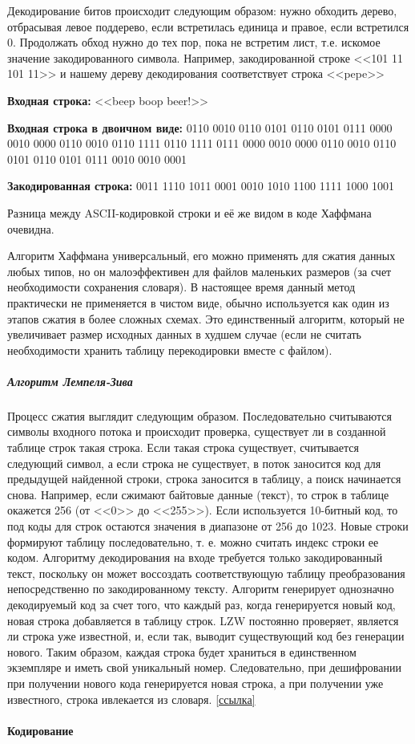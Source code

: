 Декодирование битов происходит следующим образом: нужно обходить дерево,
отбрасывая левое поддерево, если встретилась единица и правое, если
встретился 0. Продолжать обход нужно до тех пор, пока не встретим лист, т.е.
искомое значение закодированного символа. Например, закодированной строке
<<101 11 101 11>> и нашему дереву декодирования соответствует строка <<pepe>>

\noindent \textbf{Входная строка: }<<beep boop beer!>>

\noindent \textbf{Входная строка в двоичном виде:} 0110 0010 0110 0101 0110
0101 0111 0000 0010 0000 0110 0010 0110 1111 0110 1111 0111 0000 0010 0000
0110 0010 0110 0101 0110 0101 0111 0010 0010 0001

\noindent \textbf{Закодированная строка:} 0011 1110 1011 0001 0010 1010 1100
1111 1000 1001

Разница между ASCII-кодировкой строки и её же видом в коде Хаффмана очевидна.

Алгоритм Хаффмана универсальный, его можно применять для сжатия данных любых
типов, но он малоэффективен для файлов маленьких размеров (за счет
необходимости сохранения словаря). В настоящее время данный метод практически
не применяется в чистом виде, обычно используется как один из этапов сжатия в
более сложных схемах. Это единственный алгоритм, который не увеличивает
размер исходных данных в худшем случае (если не считать необходимости хранить
таблицу перекодировки вместе с файлом).

\subparagraph{Алгоритм Лемпеля-Зива}

Процесс сжатия выглядит следующим образом. Последовательно считываются
символы входного потока и происходит проверка, существует ли в созданной
таблице строк такая строка. Если такая строка существует, считывается
следующий символ, а если строка не существует, в поток заносится код для
предыдущей найденной строки, строка заносится в таблицу, а поиск начинается
снова. Например, если сжимают байтовые данные (текст), то строк в таблице
окажется 256 (от <<0>> до <<255>>). Если используется 10-битный код, то под
коды для строк остаются значения в диапазоне от 256 до 1023. Новые строки
формируют таблицу последовательно, т. е. можно считать индекс строки ее
кодом. Алгоритму декодирования на входе требуется только закодированный
текст, поскольку он может воссоздать соответствующую таблицу преобразования
непосредственно по закодированному тексту. Алгоритм генерирует однозначно
декодируемый код за счет того, что каждый раз, когда генерируется новый код,
новая строка добавляется в таблицу строк. LZW постоянно проверяет, является
ли строка уже известной, и, если так, выводит существующий код без генерации
нового. Таким образом, каждая строка будет храниться в единственном
экземпляре и иметь свой уникальный номер. Следовательно, при дешифровании при
получении нового кода генерируется новая строка, а при получении уже
известного, строка ивлекается из словаря.
\href{https://habrahabr.ru/post/132683/}{[ссылка]}
\\
\\
\noindent\textbf{Кодирование}

